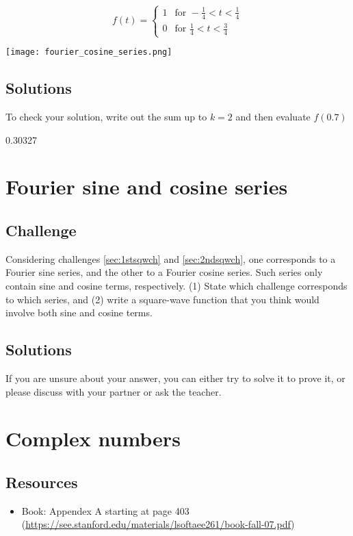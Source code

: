\begin{equation}
   f(t) =
   \begin{cases}
       1 & \text{for } -\frac{1}{4} < t < \frac{1}{4} \\
       0 & \text{for } \frac{1}{4} < t <\frac{3}{4} 
   \end{cases} 
\end{equation}

\texttt{[image: fourier\_cosine\_series.png]}

\subsection*{Solutions}
To check your solution, write out the sum up to $k=2$ and then evaluate $f(0.7)$

0.30327




\newpage
\section{Fourier sine and cosine series}

\subsection*{Challenge}
Considering challenges \ref{sec:1stsqwch} and \ref{sec:2ndsqwch}, one corresponds to a Fourier sine series, and the other to a Fourier cosine series. Such series only contain sine and cosine terms, respectively. (1) State which challenge corresponds to which series, and (2) write a square-wave function that you think would involve both sine and cosine terms.

\subsection*{Solutions}
If you are unsure about your answer, you can either try to solve it to prove it, or please discuss with your partner or ask the teacher.



\newpage
\section{Complex numbers}

\subsection*{Resources}
\begin{itemize}
    \item Book: Appendex A starting at page 403 (\url{https://see.stanford.edu/materials/lsoftaee261/book-fall-07.pdf})
\end{itemize}

